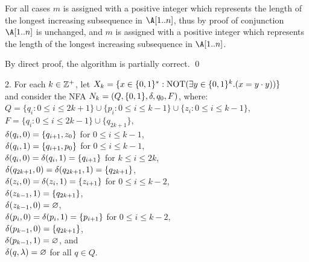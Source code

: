 \documentclass[11pt, sakura, night, 1in]{hw}
\begin{document}
{    For all cases $m$ is assigned with a positive integer which represents the length of the longest increasing subsequence in $\A[1..n]$, thus by proof of conjunction $\A[1..n]$ is unchanged, and $m$ is assigned with a positive integer which represents the length of the longest increasing subsequence in $\A[1..n]$.   
}

By direct proof, the algorithm is partially correct. \qed


2. For each $k \in \mathbb{Z}^+$, let 
$ X_k = \{x \in \{0,1\}^*  :  \mathrm{NOT} (\exists y \in \{0,1\}^k. (x = y\cdot y))\}$\\
and  consider the NFA $N_k = (Q, \{0,1\}, \delta, q_{0}, F)$,   where:\\
$Q = \{ q_i :  0 \le i \le 2k+1 \} \cup \{p_i : 0 \le i \le k-1\} \cup \{z_i  : 0 \le i \le k-1\}$,\\
$F =  \{q_i  :  0 \le i \le 2k -1 \} \cup \{q_{2k+1}\}$,\\
$\delta(q_i, 0) = \{q_{i+1}, z_0 \}$  for $0 \le i \le k-1$,\\
$\delta(q_i, 1) = \{q_{i+1}, p_0 \}$  for $0 \le i \le k-1$,\\
$\delta(q_i,0) = \delta(q_i,1) = \{q_{i+1}\}$ for $k \le i \le 2k$,\\
$\delta(q_{2k+1},0) = \delta(q_{2k+1},1) = \{q_{2k+1}\}$, \\
$\delta(z_i, 0) = \delta(z_i,1) = \{z_{i+1}\}$  for  $0 \le i \le k-2$,\\
$\delta(z_{k-1},1) =  \{q_{2k+1}\}$,\\
$\delta(z_{k-1},0) =  \varnothing$,\\ 
$\delta(p_i, 0) = \delta(p_i,1) = \{p_{i+1}\}$  for  $0 \le i \le k-2$,\\
$\delta(p_{k-1},0) =   \{q_{2k+1}\}$,\\
$\delta(p_{k-1},1) =  \varnothing$, and\\
$\delta(q,\lambda) = \varnothing$ for all $q \in Q$.\\

\end{document}
